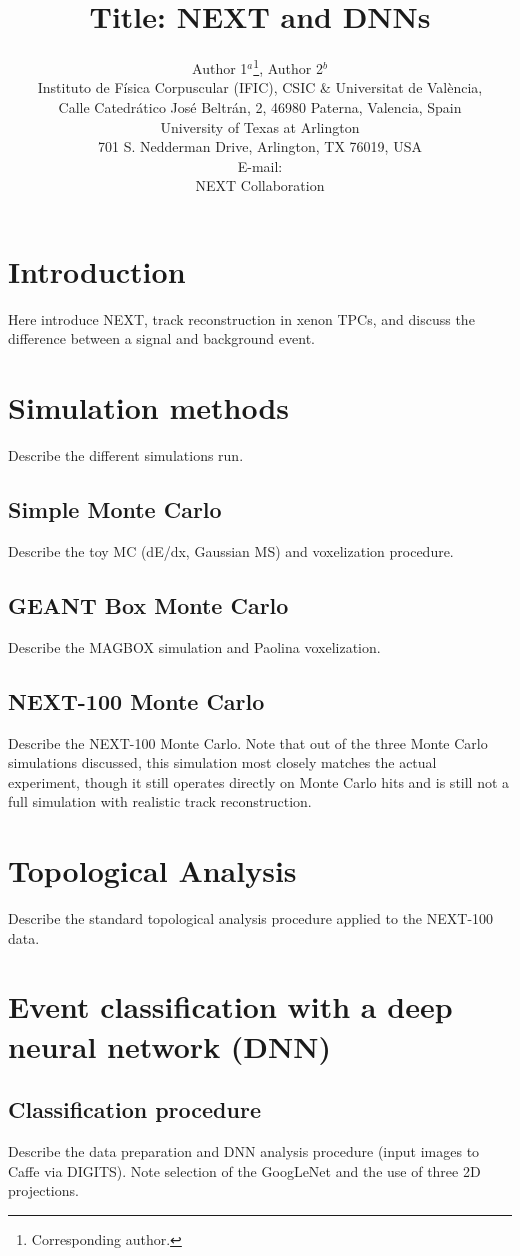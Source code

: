 \documentclass{JINST}
\title{Title: NEXT and DNNs}
\author{Author 1$^a$\thanks{Corresponding author.},
Author 2$^b$\\
\llap{$^a$}Instituto de F\'isica Corpuscular (IFIC), CSIC \& Universitat de Val\`encia,\\ 
Calle Catedr\'atico Jos\'e Beltr\'an, 2, 46980 Paterna, Valencia, Spain\\
\llap{$^b$}University of Texas at Arlington\\
 701 S. Nedderman Drive, Arlington, TX 76019, USA\\
E-mail: \email{correspodingauthor@ific.uv.es}\\

NEXT Collaboration}
\begin{document}
\section{Introduction}\label{sec:intro}
\noindent Here introduce NEXT, track reconstruction in xenon TPCs, and discuss the difference between a signal and background event.

\section{Simulation methods}
Describe the different simulations run.

\subsection{Simple Monte Carlo}
Describe the toy MC (dE/dx, Gaussian MS) and voxelization procedure.

\subsection{GEANT Box Monte Carlo}
Describe the MAGBOX simulation and Paolina voxelization.

\subsection{NEXT-100 Monte Carlo}
Describe the NEXT-100 Monte Carlo.  Note that out of the three Monte Carlo simulations discussed, this simulation most closely matches the actual experiment, though it still operates
directly on Monte Carlo hits and is still not a full simulation with realistic track reconstruction.

\section{Topological Analysis}
Describe the standard topological analysis procedure applied to the NEXT-100 data.

\section{Event classification with a deep neural network (DNN)}
\subsection{Classification procedure}
Describe the data preparation and DNN analysis procedure (input images to Caffe via DIGITS).  Note selection of the GoogLeNet and the use of three 2D projections.
\end{document}
